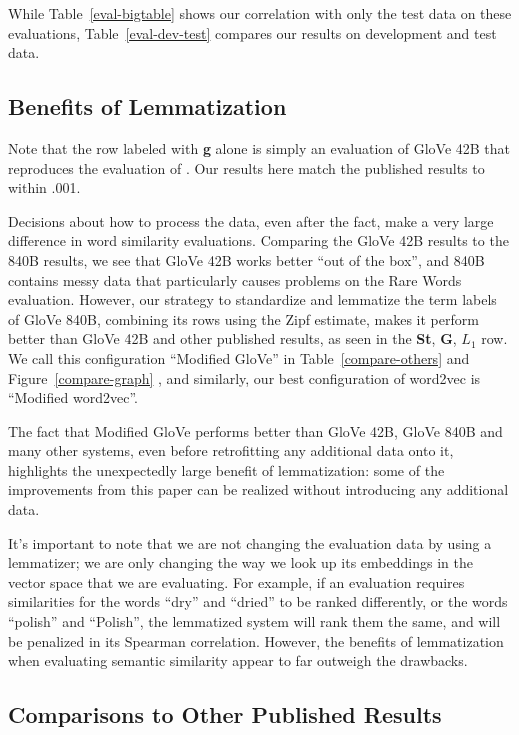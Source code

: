 \documentclass[11pt,letterpaper]{article}
\begin{document}
While Table~\ref{eval-bigtable} shows our correlation with only the test data on
these evaluations, Table~\ref{eval-dev-test} compares our results on
development and test data.

\subsection{Benefits of Lemmatization}

Note that the row labeled with {\bf g} alone is simply an evaluation of GloVe
42B that reproduces the evaluation of . Our results
here match the published results to within .001.

Decisions about how to process the data, even after
the fact, make a very large difference in word similarity evaluations.
Comparing the GloVe 42B results to the 840B results, we see that GloVe 42B
works better ``out of the box'', and 840B contains messy data that particularly
causes problems on the Rare Words evaluation. However, our strategy to
standardize and lemmatize the term labels of GloVe 840B, combining its rows using
the Zipf estimate, makes it perform better than GloVe 42B and other published
results, as seen in the {\bf St}, {\bf G}, $L_1$ row. We call this
configuration ``Modified GloVe'' in Table~\ref{compare-others} and Figure~\ref{compare-graph}
, and similarly, our best configuration of word2vec is ``Modified word2vec''.

The fact that Modified GloVe performs better than GloVe 42B, GloVe 840B and many
other systems, even before retrofitting any additional data onto it, highlights
the unexpectedly large benefit of lemmatization: some of the improvements from
this paper can be realized without introducing any additional data.

It's important to note that we are not changing the evaluation data by using
a lemmatizer; we are only changing the way we look up its embeddings in the
vector space that we are evaluating. For example, if an evaluation requires
similarities for the words ``dry'' and ``dried'' to be ranked differently, or
the words ``polish'' and ``Polish'', the lemmatized system will rank them the
same, and will be penalized in its Spearman correlation.
However, the benefits of lemmatization when evaluating semantic similarity
appear to far outweigh the drawbacks.

\subsection{Comparisons to Other Published Results}
\end{document}
